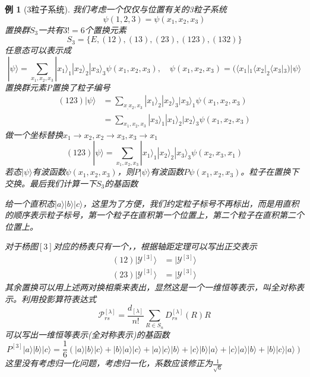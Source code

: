 \documentclass[12pt]{article}
\newtheorem{example}{例}[subsection]
\begin{document}
\begin{example}[3粒子系统]
    我们考虑一个仅仅与位置有关的3粒子系统
    \begin{equation*}
        \psi(1,2,3)=\psi(x_1,x_2,x_3)
    \end{equation*}
    置换群$S_3$一共有$3!=6$个置换元素
    \begin{equation*}
        S_3=\{E,(12),(13),(23),(123),(132)\}
    \end{equation*}
    任意态可以表示成
    \begin{equation*}
        |\psi\rangle=\sum_{x_1,x_2,x_3}|x_1\rangle_1|x_2\rangle_2|x_3\rangle_3\psi(x_1,x_2,x_3),\quad \psi(x_1,x_2,x_3)=(\langle x_1|_1\langle x_2|_2\langle x_3|_3)|\psi\rangle
    \end{equation*}
    置换群元素P置换了粒子编号
    \begin{equation*}
        \begin{split}
            (123)|\psi\rangle&=\sum_{x_,x_2,x_3}|x_1\rangle_2|x_2\rangle_3|x_3\rangle_1\psi(x_1,x_2,x_3)\\
            &=\sum_{x_1,x_2,x_3}|x_3\rangle_1|x_1\rangle_2|x_2\rangle_3\psi(x_1,x_2,x_3)
        \end{split}
    \end{equation*}
    做一个坐标替换$x_1\rightarrow x_2,x_2\rightarrow x_3,x_3\rightarrow x_1$
    \begin{equation*}
        (123)|\psi\rangle=\sum_{x_1,x_2,x_3}|x_1\rangle_1|x_2\rangle_2|x_3\rangle_3\psi(x_2,x_3,x_1)
    \end{equation*}
    若态$|\psi\rangle$有波函数$\psi(x_1,x_2,x_3)$，则$P|\psi\rangle$有波函数$P\psi(x_1,x_2,x_3)$。粒子在置换下交换。最后我们计算一下$S_3$的基函数

    给一个直积态$|a\rangle|b\rangle|c\rangle$，这里为了方便，我们约定粒子标号不再标出，而是用直积的顺序表示粒子标号，第一个粒子在直积第一个位置上，第二个粒子在直积第二个位置上。

    对于杨图$[3]$对应的杨表只有一个，，根据轴距定理可以写出正交表示
    \begin{equation*}
        \begin{split}
            (12)|\mathcal{Y}^{[3]}\rangle&=|\mathcal{Y}^{[3]}\rangle\\
            (23)|\mathcal{Y}^{[3]}\rangle&=|\mathcal{Y}^{[3]}\rangle
        \end{split}
    \end{equation*}
    其余置换可以用上述两对换相乘来表出，显然这是一个一维恒等表示，叫全对称表示。利用投影算符表达式
    \begin{equation*}
        \mathcal{P}_{rs}^{[\lambda]}=\frac{d_{[\lambda]}}{n!}\sum_{R\in S_n}D_{rs}^{[\lambda]}(R)R
    \end{equation*}
    可以写出一维恒等表示(全对称表示)的基函数
    \begin{equation*}
        P^{[3]}|a\rangle|b\rangle|c\rangle=\frac{1}{6}(|a\rangle|b\rangle|c\rangle+|b\rangle|a\rangle|c\rangle+|a\rangle|c\rangle|b\rangle+|c\rangle|b\rangle|a\rangle+|c\rangle|a\rangle|b\rangle+|b\rangle|c\rangle|a\rangle)
    \end{equation*}
    这里没有考虑归一化问题，考虑归一化，系数应该修正为$\frac{1}{\sqrt{6}}$


\end{example}
\end{document}
